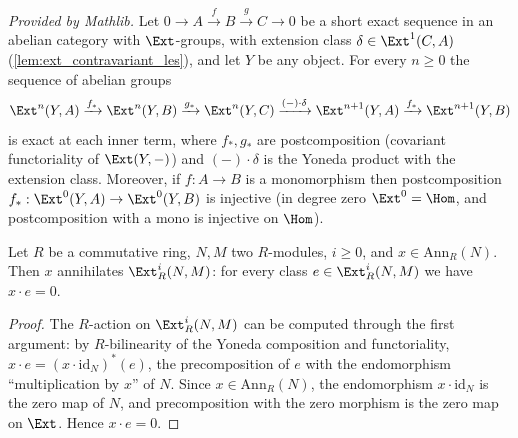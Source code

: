 \begin{lemma}
  \label{lem:ext_covariant_les}
  \mathlibok
  \textit{Provided by Mathlib.}
  Let \(0 \to A \xrightarrow{f} B \xrightarrow{g} C \to 0\) be a short exact sequence in
  an abelian category with \(\Ext\)-groups, with extension class
  \(\delta \in \Ext^1(C, A)\) (\ref{lem:ext_contravariant_les}), and let \(Y\) be any
  object. For every \(n \geq 0\) the sequence of abelian groups
  \[
    \Ext^n(Y, A) \xrightarrow{f_*} \Ext^n(Y, B) \xrightarrow{g_*} \Ext^n(Y, C)
      \xrightarrow{(-) \cdot \delta} \Ext^{n+1}(Y, A) \xrightarrow{f_*} \Ext^{n+1}(Y, B)
  \]
  is exact at each inner term, where \(f_*, g_*\) are postcomposition (covariant
  functoriality of \(\Ext(Y, -)\)) and \((-) \cdot \delta\) is the Yoneda product with
  the extension class. Moreover, if \(f : A \to B\) is a monomorphism then
  postcomposition \(f_* : \Ext^0(Y, A) \to \Ext^0(Y, B)\) is injective (in degree zero
  \(\Ext^0 = \Hom\), and postcomposition with a mono is injective on \(\Hom\)).
\end{lemma}

\begin{lemma}
  \label{lem:ext_annihilator_smul}
  \leanok
  Let \(R\) be a commutative ring, \(N, M\) two \(R\)-modules, \(i \geq 0\), and
  \(x \in \mathrm{Ann}_R(N)\). Then \(x\) annihilates \(\Ext^i_R(N, M)\): for every
  class \(e \in \Ext^i_R(N, M)\) we have \(x \cdot e = 0\).
\end{lemma}
\begin{proof}
  \leanok
  The \(R\)-action on \(\Ext^i_R(N, M)\) can be computed through the first argument: by
  \(R\)-bilinearity of the Yoneda composition and functoriality,
  \(x \cdot e = (x \cdot \mathrm{id}_N)^*(e)\), the precomposition of \(e\) with the
  endomorphism ``multiplication by \(x\)'' of \(N\). Since \(x \in \mathrm{Ann}_R(N)\),
  the endomorphism \(x \cdot \mathrm{id}_N\) is the zero map of \(N\), and
  precomposition with the zero morphism is the zero map on \(\Ext\). Hence
  \(x \cdot e = 0\).
\end{proof}

